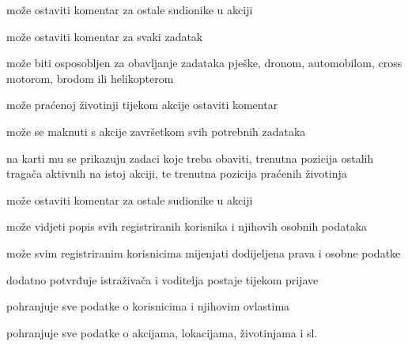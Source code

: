 \begin{packed_enum}
\begin{packed_enum}
\begin{packed_enum}
					\end{packed_enum}
					\item može ostaviti komentar za ostale sudionike u akciji 
					\item može ostaviti komentar za svaki zadatak 
					
				\end{packed_enum}
				
				\item  {}
				
				\begin{packed_enum}
					
					\item može biti osposobljen za obavljanje zadataka pješke, dronom, automobilom, cross motorom, brodom ili helikopterom 
					\item može praćenoj životinji tijekom akcije ostaviti komentar 
					\item može se maknuti s akcije završetkom svih potrebnih zadataka 
					\item na karti mu se prikazuju zadaci koje treba obaviti, trenutna pozicija ostalih tragača aktivnih na istoj akciji, te trenutna pozicija praćenih životinja 
					\item može ostaviti komentar za ostale sudionike u akciji 
					
				\end{packed_enum}
				
				\item  {}
				
				\begin{packed_enum}
					
					\item može vidjeti popis svih registriranih korisnika i njihovih osobnih podataka  
					\item može svim registriranim korisnicima mijenjati dodijeljena prava i osobne podatke 
					\item dodatno potvrđuje istraživača i voditelja postaje tijekom prijave 
					
				\end{packed_enum}
				
				\item  {}
				
				\begin{packed_enum}
					
					\item pohranjuje sve podatke o korisnicima i njihovim ovlastima 
					\item pohranjuje sve podatke o akcijama, lokacijama, životinjama i sl. 
					
				\end{packed_enum}
			\end{packed_enum}
			
